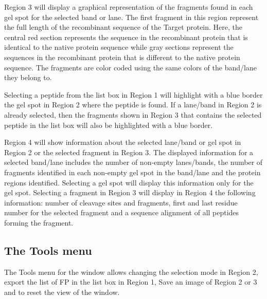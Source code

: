 Region \num{3} will display a graphical representation of the fragments found in each gel spot for the selected band or lane. The first fragment in this region represent the full length of the recombinant sequence of the Target protein. Here, the central red section represents the sequence in the recombinant protein that is identical to the native protein sequence while gray sections represent the sequences in the recombinant protein that is different to the native protein sequence. The fragments are color coded using the same colors of the band/lane they belong to.

Selecting a peptide from the list box in Region \num{1} will highlight with a blue border the gel spot in Region \num{2} where the peptide is found. If a lane/band in Region \num{2} is already selected, then the fragments shown in Region \num{3} that contains the selected peptide in the list box will also be highlighted with a blue border.

Region \num{4} will show information about the selected lane/band or gel spot in Region \num{2} or the selected fragment in Region \num{3}. The displayed information for a selected band/lane includes the number of non-empty lanes/bands, the number of fragments identified in each non-empty gel spot in the band/lane and the protein regions identified. Selecting a gel spot will display this information only for the gel spot. Selecting a fragment in Region \num{3} will display in Region \num{4} the following information: number of cleavage sites and fragments, first and last residue number for the selected fragment and a sequence alignment of all peptides forming the fragment.  

\subsection{The Tools menu}

The Tools menu for the window allows changing the selection mode in Region \num{2}, export the list of FP in the list box in Region \num{1}, Save an image of Region \num{2} or \num{3} and to reset the view of the window.